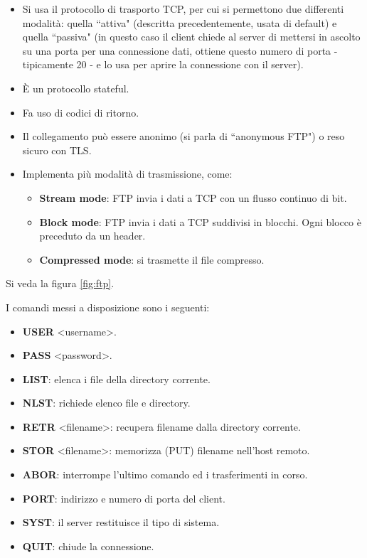 \documentclass[11pt, italian, openany]{book}
\begin{document}
\begin{sloppypar}
\begin{itemize}[topsep=0pt, itemsep=0pt, parsep=0pt]
\begin{itemize}[topsep=0pt, itemsep=0pt, parsep=0pt]
		Il server apre una connessione dati TCP con il client (caveat: non \`e il client a farlo, si parla di ``modalit\`a attiva"), trasferisce il
		file sulla connessione dati e, terminata l'operazione, il server chiude la connessione. La connessione dati non \`e persistente, ne viene
		aperta e chiusa una per ciascun trasferimento.
		\item Si usa il protocollo di trasporto TCP, per cui si permettono due differenti modalit\`a: quella ``attiva" (descritta precedentemente,
		usata di default) e quella ``passiva" (in questo caso il client chiede al server di mettersi in ascolto su una porta per una connessione dati,
		ottiene questo numero di porta - tipicamente 20 - e lo usa per aprire la connessione con il server).
		\item \`E un protocollo stateful.
		\item Fa uso di codici di ritorno.
		\item Il collegamento pu\`o essere anonimo (si parla di ``anonymous FTP") o reso sicuro con TLS.
		\item Implementa pi\`u modalit\`a di trasmissione, come:
		\begin{itemize}[topsep=0pt, itemsep=0pt, parsep=0pt]
			\item \textbf{Stream mode}: FTP invia i dati a TCP con un flusso continuo di bit.
			\item \textbf{Block mode}: FTP invia i dati a TCP suddivisi in blocchi. Ogni blocco è preceduto da un header.
			\item \textbf{Compressed mode}: si trasmette il file compresso.
			\end{itemize}
	\end{itemize}

	Si veda la figura \ref{fig:ftp}.

	I comandi messi a disposizione sono i seguenti:
	\begin{itemize}[topsep=0pt, itemsep=0pt, parsep=0pt]
		\item \textbf{USER} \textless{username}\textgreater{.}
		\item \textbf{PASS} \textless{password}\textgreater{.}
		\item \textbf{LIST}: elenca i file della directory corrente.
		\item \textbf{NLST}: richiede elenco file e directory.
		\item \textbf{RETR} \textless{filename}\textgreater{:} recupera filename dalla directory corrente.
		\item \textbf{STOR} \textless{filename}\textgreater{:} memorizza (PUT) filename nell'host remoto.
		\item \textbf{ABOR}: interrompe l’ultimo comando ed i trasferimenti in corso.
		\item \textbf{PORT}: indirizzo e numero di porta del client.
		\item \textbf{SYST}: il server restituisce il tipo di sistema.
		\item \textbf{QUIT}: chiude la connessione.
	\end{itemize}
\end{itemize}


\end{sloppypar}
\end{document}
